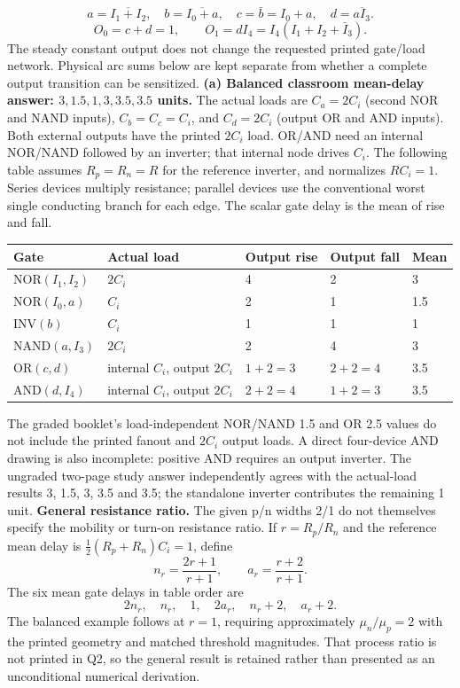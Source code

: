 \documentclass[10pt]{article}
\begin{document}
\[a=\overline{I_1+I_2},\quad b=\overline{I_0+a},\quad c=\bar b=I_0+a,\quad d=\overline{aI_3}.\]
\[\boxed{O_0=c+d=1,\qquad O_1=dI_4=I_4(I_1+I_2+\bar I_3).}\]
The steady constant output does not change the requested printed gate/load network. Physical arc sums below are kept separate from whether a complete output transition can be sensitized.
\newpage
\textbf{(a) Balanced classroom mean-delay answer: $3,1.5,1,3,3.5,3.5$ units.}
The actual loads are $C_a=2C_i$ (second NOR and NAND inputs), $C_b=C_c=C_i$, and $C_d=2C_i$ (output OR and AND inputs). Both external outputs have the printed $2C_i$ load. OR/AND need an internal NOR/NAND followed by an inverter; that internal node drives $C_i$.
The following table assumes $R_p=R_n=R$ for the reference inverter, and normalizes $RC_i=1$. Series devices multiply resistance; parallel devices use the conventional worst single conducting branch for each edge. The scalar gate delay is the mean of rise and fall.
\begin{center}\begin{tabular}{lllll}\toprule Gate&Actual load&Output rise&Output fall&Mean\\\midrule
NOR$(I_1,I_2)$&$2C_i$&4&2&3\\
NOR$(I_0,a)$&$C_i$&2&1&1.5\\
INV$(b)$&$C_i$&1&1&1\\
NAND$(a,I_3)$&$2C_i$&2&4&3\\
OR$(c,d)$&internal $C_i$, output $2C_i$&$1+2=3$&$2+2=4$&3.5\\
AND$(d,I_4)$&internal $C_i$, output $2C_i$&$2+2=4$&$1+2=3$&3.5\\\bottomrule\end{tabular}\end{center}
The graded booklet's load-independent NOR/NAND 1.5 and OR 2.5 values do not include the printed fanout and $2C_i$ output loads. A direct four-device AND drawing is also incomplete: positive AND requires an output inverter. The ungraded two-page study answer independently agrees with the actual-load results 3, 1.5, 3, 3.5 and 3.5; the standalone inverter contributes the remaining 1 unit.
\textbf{General resistance ratio.} The given p/n widths 2/1 do not themselves specify the mobility or turn-on resistance ratio. If $r=R_p/R_n$ and the reference mean delay is $\tfrac12(R_p+R_n)C_i=1$, define
\[n_r=\frac{2r+1}{r+1},\qquad a_r=\frac{r+2}{r+1}.\]
The six mean gate delays in table order are
\[\boxed{2n_r,\quad n_r,\quad1,\quad2a_r,\quad n_r+2,\quad a_r+2.}\]
The balanced example follows at $r=1$, requiring approximately $\mu_n/\mu_p=2$ with the printed geometry and matched threshold magnitudes. That process ratio is not printed in Q2, so the general result is retained rather than presented as an unconditional numerical derivation.
\end{document}
